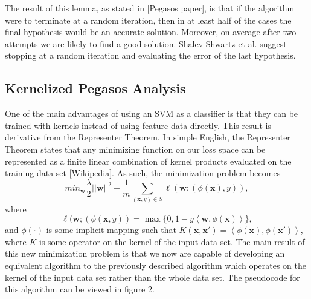\documentclass{article}
\begin{document}
The result of this lemma, as stated in [Pegasos paper], is that if the algorithm were to terminate at a
random iteration, then in at least half of the cases the final hypothesis would be an accurate solution.
Moreover, on average after two attempts we are likely to find a good solution. Shalev-Shwartz et al. suggest
stopping at a random iteration and evaluating the error of the last hypothesis.

\subsection{Kernelized Pegasos Analysis}
One of the main advantages of using an SVM as a classifier is that they can be trained with kernels
instead of using feature data directly. This result is derivative from the Representer Theorem. In simple
English, the Representer Theorem states that any minimizing function on our loss space can be represented as a
finite linear combination of kernel products evaluated on the training data set [Wikipedia]. As such,
the minimization problem becomes
$${min}_{\mathbf{w}}\frac{\lambda}{2}||\mathbf{w}||^2+\frac{1}{m}\sum_{(\mathbf{x},y)\in S} \ell(\mathbf{w}:(\phi(\mathbf{x}),y)),$$
where
$$\ell(\mathbf{w};(\phi(\mathbf{x},y))=\max\{0,1-y\left<\mathbf{w},\phi(\mathbf{x})\right>\},$$
and $\phi(\cdot)$ is some implicit mapping such that 
$K(\mathbf{x},\mathbf{x}')=\left<\phi(\mathbf{x}),\phi(\mathbf{x}')\right>$, where $K$ is some operator
on the kernel of the input data set. The main result of this new minimization problem is that we now
are capable of developing an equivalent algorithm to the previously described algorithm which operates
on the kernel of the input data set rather than the whole data set. The pseudocode for this algorithm
can be viewed in figure 2.
\end{document}
